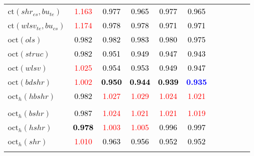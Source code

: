 \begin{tabular}[t]{l|>{}cccc>{}c|ccccc}
ct$(shr_{cs}, bu_{te})$ & \textcolor{red}{1.163} & \textcolor{black}{0.977} & \textcolor{black}{0.965} & \textcolor{black}{0.977} & \textcolor{black}{0.965} &  &  &  &  & \\
ct$(wlsv_{te}, bu_{cs})$ & \textcolor{red}{1.174} & \textcolor{black}{0.978} & \textcolor{black}{0.978} & \textcolor{black}{0.971} & \textcolor{black}{0.971} &  &  &  &  & \\
oct$(ols)$ & \textcolor{black}{0.982} & \textcolor{black}{0.982} & \textcolor{black}{0.983} & \textcolor{black}{0.980} & \textcolor{black}{0.975} &  &  &  &  & \\
oct$(struc)$ & \textcolor{black}{0.982} & \textcolor{black}{0.951} & \textcolor{black}{0.949} & \textcolor{black}{0.947} & \textcolor{black}{0.943} &  &  &  &  & \\
oct$(wlsv)$ & \textcolor{red}{1.025} & \textcolor{black}{0.954} & \textcolor{black}{0.953} & \textcolor{black}{0.949} & \textcolor{black}{0.947} &  &  &  &  & \\
oct$(bdshr)$ & \textcolor{red}{1.002} & \textcolor{black}{\textbf{0.950}} & \textcolor{black}{\textbf{0.944}} & \textcolor{black}{\textbf{0.939}} & \textcolor{blue}{\textbf{0.935}} &  &  &  &  & \\
oct$_h(hbshr)$ & \textcolor{black}{0.982} & \textcolor{red}{1.027} & \textcolor{red}{1.029} & \textcolor{red}{1.024} & \textcolor{red}{1.021} &  &  &  &  & \\[-1.5ex]
\hline\\[-1.5ex]
oct$_h(bshr)$ & \textcolor{black}{0.987} & \textcolor{red}{1.024} & \textcolor{red}{1.021} & \textcolor{red}{1.021} & \textcolor{red}{1.019} &  &  &  &  & \\
oct$_h(hshr)$ & \textcolor{black}{\textbf{0.978}} & \textcolor{red}{1.003} & \textcolor{red}{1.005} & \textcolor{black}{0.996} & \textcolor{black}{0.997} &  &  &  &  & \\
oct$_h(shr)$ & \textcolor{red}{1.010} & \textcolor{black}{0.963} & \textcolor{black}{0.956} & \textcolor{black}{0.952} & \textcolor{black}{0.952} &  &  &  &  & \\
\bottomrule
{}\\
\end{tabular}
